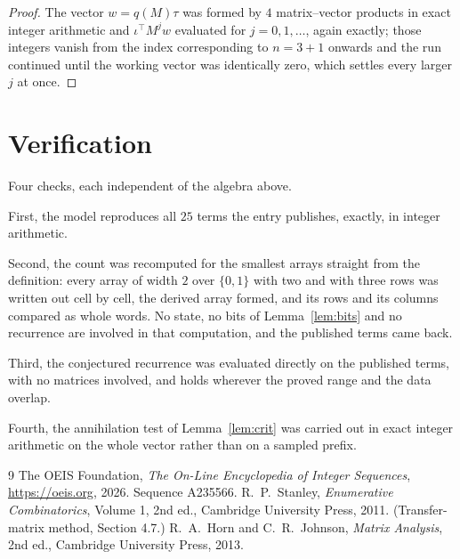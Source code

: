 \documentclass[11pt,a4paper]{article}
\theoremstyle{plain}
\theoremstyle{definition}
\begin{document}
\begin{proof}
The vector $w=q(M)\tau$ was formed by $4$ matrix--vector products in exact integer
arithmetic and $\iota^{\!\top}M^{j}w$ evaluated for $j=0,1,\dots$, again exactly; those
integers vanish from the index corresponding to $n=3+1$ onwards and the run continued
until the working vector was identically zero, which settles every larger $j$ at once.
\end{proof}

\section{Verification}

Four checks, each independent of the algebra above.

First, the model reproduces all $25$ terms the entry publishes, exactly, in integer
arithmetic.

Second, the count was recomputed for the smallest arrays straight from the definition: every
array of width $2$ over $\{0,1\}$ with two and with three rows was written out cell by cell,
the derived array formed, and its rows and its columns compared as whole words. No state, no
bits of Lemma~\ref{lem:bits} and no recurrence are involved in that computation, and the
published terms came back.

Third, the conjectured recurrence was evaluated directly on the published terms, with no
matrices involved, and holds wherever the proved range and the data overlap.

Fourth, the annihilation test of Lemma~\ref{lem:crit} was carried out in exact integer
arithmetic on the whole vector rather than on a sampled prefix.

\begin{thebibliography}{9}
 The OEIS Foundation, \emph{The On-Line Encyclopedia of Integer
Sequences}, \url{https://oeis.org}, 2026. Sequence A235566.
 R.~P.~Stanley, \emph{Enumerative Combinatorics}, Volume 1, 2nd ed.,
Cambridge University Press, 2011. (Transfer-matrix method, Section 4.7.)
 R.~A.~Horn and C.~R.~Johnson, \emph{Matrix Analysis}, 2nd ed., Cambridge
University Press, 2013.
\end{thebibliography}
\end{document}
